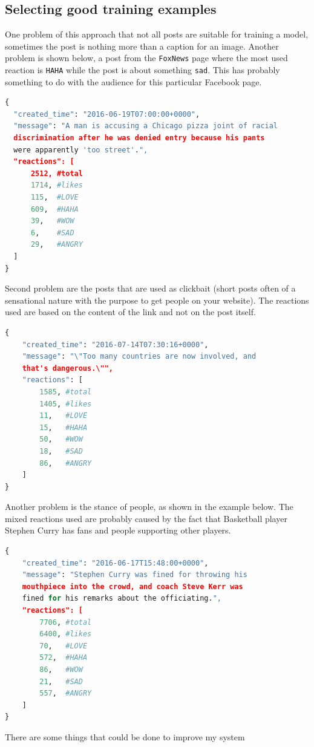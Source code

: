 \documentclass[
10pt, %
a4paper, %
oneside, %
headinclude,footinclude, %
BCOR5mm, %
]{scrartcl}
\begin{document}
\subsection{Selecting good training examples}
One problem of this approach that not all posts are suitable for training a model, sometimes the post is nothing more than a caption for an image. Another problem is shown below, a post from the \texttt{FoxNews} page where the most used reaction is \texttt{HAHA} while the post is about something \texttt{sad}. This has probably something to do with the audience for this particular Facebook page.
\begin{lstlisting}[language=Python, caption="Example post"]
{
  "created_time": "2016-06-19T07:00:00+0000",
  "message": "A man is accusing a Chicago pizza joint of racial
  discrimination after he was denied entry because his pants
  were apparently 'too street'.",
  "reactions": [
      2512, #total
      1714, #likes
      115,  #LOVE
      609,  #HAHA
      39,   #WOW
      6,    #SAD
      29,   #ANGRY
  ]
}
\end{lstlisting}
Second problem are the posts that are used as clickbait (short posts often of a sensational nature with the purpose to get people on your website). The reactions used are based on the content of the link and not on the post itself.
\begin{lstlisting}[language=Python, caption="Example post"]
{
    "created_time": "2016-07-14T07:30:16+0000",
    "message": "\"Too many countries are now involved, and 
    that's dangerous.\"",
    "reactions": [
        1585, #total
        1405, #likes
        11,   #LOVE
        15,	  #HAHA
        50,   #WOW
        18,   #SAD
        86,   #ANGRY
    ]
}
\end{lstlisting}
Another problem is the stance of people, as shown in the example below. The mixed reactions used are probably caused by the fact that Basketball player Stephen Curry has fans and people supporting other players.
\begin{lstlisting}[language=Python, caption="Example post"]
{
    "created_time": "2016-06-17T15:48:00+0000",
    "message": "Stephen Curry was fined for throwing his
    mouthpiece into the crowd, and coach Steve Kerr was 
    fined for his remarks about the officiating.",
    "reactions": [
        7706, #total
        6400, #likes
        70,   #LOVE
        572,  #HAHA
        86,   #WOW
        21,   #SAD
        557,  #ANGRY
    ]
}
\end{lstlisting}
There are some things that could be done to improve my system
\end{document}
